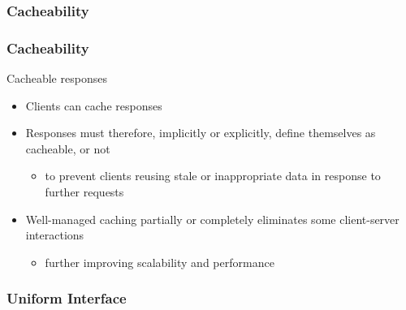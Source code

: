 \subsubsection{Cacheability}

\begin{frame}
	\frametitle{Cacheability}
	
	\begin{block}{Cacheable responses}
		\begin{itemize}
			\item Clients can cache responses
			\item Responses must therefore, implicitly or explicitly, define themselves as cacheable, or not
			\begin{itemize}
				\item to prevent clients reusing stale or inappropriate data in response to further requests
			\end{itemize}
			\item Well-managed caching partially or completely eliminates some client-server interactions
			\begin{itemize}
				\item further improving scalability and performance
			\end{itemize}
		\end{itemize}
	
	\end{block}
\end{frame}

\subsubsection{Uniform Interface}

